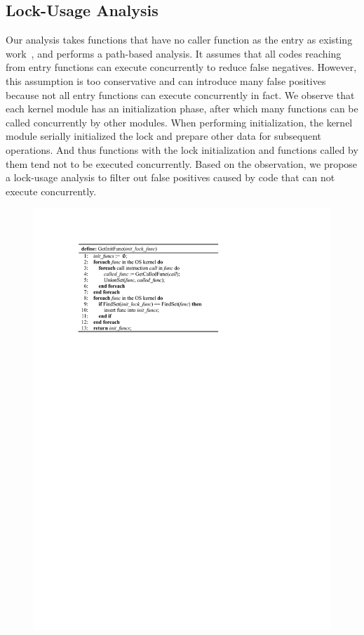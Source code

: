 \subsection{Lock-Usage Analysis}
\label{subsec_lock_usage_analysis}
Our analysis takes functions that have no caller function as the entry as 
existing work~\cite{Li:ASPLOS22}, and performs a path-based analysis. It 
assumes that all codes reaching from entry functions can execute concurrently 
to reduce false negatives. However, this assumption is too conservative and can 
introduce many false positives because not all entry functions can execute 
concurrently in fact. We observe that each kernel module has an initialization 
phase, after which many functions can be called concurrently by other modules. 
When performing initialization, the kernel module serially initialized the lock 
and prepare other data for subsequent operations. And thus functions with the 
lock initialization and functions called by them tend not to be executed 
concurrently. Based on the observation, we propose a lock-usage analysis to 
filter out false positives caused by code that can not execute concurrently.

\begin{figure}[htbp]
	\centering
	\includegraphics[width=0.9\linewidth]{figures/fig_pseudocode_lock_usage.pdf}
	\label{fig_pseudocode_lock_usage}
\end{figure}


